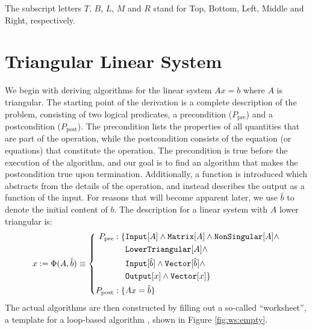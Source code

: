 
%
%
The subscript letters $T$, $B$, $L$, $M$ and $R$ stand for Top, Bottom, Left, Middle and Right, respectively.


\section{Triangular Linear System}
\label{sec:triLS}

We begin with deriving algorithms for the linear system $Ax = b$ where $A$ is triangular.
The starting point of the derivation is a complete description of the problem, consisting of two logical predicates, a precondition ($P_\text{pre}$) and a postcondition ($P_\text{post}$). The precondition lists the properties of all quantities that are part of the operation, while the postcondition consists of the equation (or equations) that constitute the operation. The precondition is true before the execution of the algorithm, and our goal is to find an algorithm that makes the postcondition true upon termination. Additionally, a function is introduced which abstracts from the details of the operation, and instead describes the output as a function of the input. For reasons that will become apparent later, we use $\hat{b}$ to denote the initial content of $b$. The description for a linear system with $A$ lower triangular is:
%
$$x:= \Phi ( A, \hat{b}) \equiv
\left\{
\begin{aligned}
P_\text{pre}: \{ &\text{\ttfamily Input}[A] \land \text{\ttfamily Matrix}[A] \land \text{\ttfamily NonSingular}[A] \land \\
		&\text{\ttfamily LowerTriangular}[A] \land \\
		&\text{\ttfamily Input}[\hat{b}] \land \text{\ttfamily Vector}[\hat{b}] \land \\
		&\text{\ttfamily Output}[x] \land \text{\ttfamily Vector}[x] \} \\
P_\text{post}: \{ & Ax = \hat{b} \}
\end{aligned}
\right.$$
%
The actual algorithms are then constructed by filling out a so-called ``worksheet'', a template for a loop-based algorithm \cite{Bientinesi:thesis, Bientinesi2005:460, Fabregat-Traver:thesis}, shown in Figure \ref{fig:ws:empty}.

